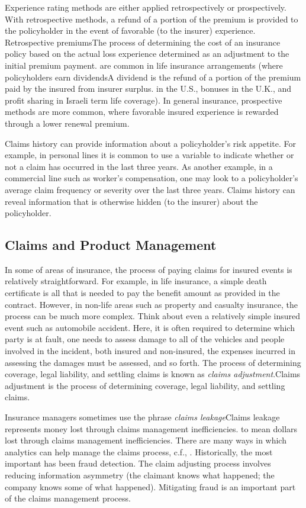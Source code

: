 \documentclass[]{book}
\theoremstyle{definition}
\theoremstyle{definition}
\theoremstyle{definition}
\theoremstyle{remark}
\begin{document}
Experience rating methods are either applied retrospectively or
prospectively. With retrospective methods, a refund of a portion of the
premium is provided to the policyholder in the event of favorable (to
the insurer) experience. Retrospective premiums{The process of
determining the cost of an insurance policy based on the actual loss
experience determined as an adjustment to the initial premium payment.}
are common in life insurance arrangements (where policyholders earn
dividends{A dividend is the refund of a portion of the premium paid by
the insured from insurer surplus.} in the U.S., bonuses in the U.K., and
profit sharing in Israeli term life coverage). In general insurance,
prospective methods are more common, where favorable insured experience
is rewarded through a lower renewal premium.

Claims history can provide information about a policyholder's risk
appetite. For example, in personal lines it is common to use a variable
to indicate whether or not a claim has occurred in the last three years.
As another example, in a commercial line such as worker's compensation,
one may look to a policyholder's average claim frequency or severity
over the last three years. Claims history can reveal information that is
otherwise hidden (to the insurer) about the policyholder.

\subsection{Claims and Product
Management}\label{claims-and-product-management}

In some of areas of insurance, the process of paying claims for insured
events is relatively straightforward. For example, in life insurance, a
simple death certificate is all that is needed to pay the benefit amount
as provided in the contract. However, in non-life areas such as property
and casualty insurance, the process can be much more complex. Think
about even a relatively simple insured event such as automobile
accident. Here, it is often required to determine which party is at
fault, one needs to assess damage to all of the vehicles and people
involved in the incident, both insured and non-insured, the expenses
incurred in assessing the damages must be assessed, and so forth. The
process of determining coverage, legal liability, and settling claims is
known as \emph{claims adjustment}.{Claims adjustment is the process of
determining coverage, legal liability, and settling claims.}

Insurance managers sometimes use the phrase \emph{claims leakage}{Claims
leakage represents money lost through claims management inefficiencies.}
to mean dollars lost through claims management inefficiencies. There are
many ways in which analytics can help manage the claims process, c.f.,
\citet{SASsurvey}. Historically, the most important has been fraud
detection. The claim adjusting process involves reducing information
asymmetry (the claimant knows what happened; the company knows some of
what happened). Mitigating fraud is an important part of the claims
management process.
\end{document}
